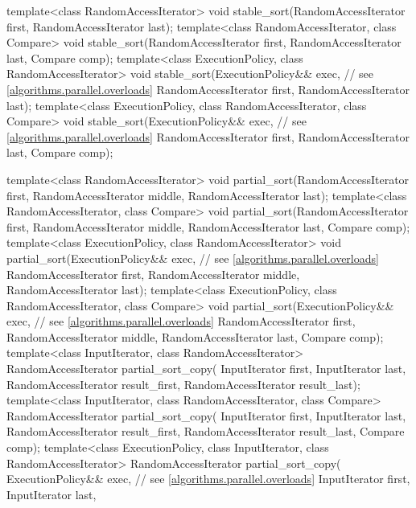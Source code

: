 \begin{codeblock}
{  template<class RandomAccessIterator>
    void stable_sort(RandomAccessIterator first, RandomAccessIterator last);
  template<class RandomAccessIterator, class Compare>
    void stable_sort(RandomAccessIterator first, RandomAccessIterator last,
                     Compare comp);
  template<class ExecutionPolicy, class RandomAccessIterator>
    void stable_sort(ExecutionPolicy&& exec, // see \ref{algorithms.parallel.overloads}
                     RandomAccessIterator first, RandomAccessIterator last);
  template<class ExecutionPolicy, class RandomAccessIterator, class Compare>
    void stable_sort(ExecutionPolicy&& exec, // see \ref{algorithms.parallel.overloads}
                     RandomAccessIterator first, RandomAccessIterator last,
                     Compare comp);

  template<class RandomAccessIterator>
    void partial_sort(RandomAccessIterator first,
                      RandomAccessIterator middle,
                      RandomAccessIterator last);
  template<class RandomAccessIterator, class Compare>
    void partial_sort(RandomAccessIterator first,
                      RandomAccessIterator middle,
                      RandomAccessIterator last, Compare comp);
  template<class ExecutionPolicy, class RandomAccessIterator>
    void partial_sort(ExecutionPolicy&& exec, // see \ref{algorithms.parallel.overloads}
                      RandomAccessIterator first,
                      RandomAccessIterator middle,
                      RandomAccessIterator last);
  template<class ExecutionPolicy, class RandomAccessIterator, class Compare>
    void partial_sort(ExecutionPolicy&& exec, // see \ref{algorithms.parallel.overloads}
                      RandomAccessIterator first,
                      RandomAccessIterator middle,
                      RandomAccessIterator last, Compare comp);
  template<class InputIterator, class RandomAccessIterator>
    RandomAccessIterator partial_sort_copy(
      InputIterator first, InputIterator last,
      RandomAccessIterator result_first,
      RandomAccessIterator result_last);
  template<class InputIterator, class RandomAccessIterator, class Compare>
    RandomAccessIterator partial_sort_copy(
      InputIterator first, InputIterator last,
      RandomAccessIterator result_first,
      RandomAccessIterator result_last,
      Compare comp);
  template<class ExecutionPolicy, class InputIterator, class RandomAccessIterator>
    RandomAccessIterator partial_sort_copy(
      ExecutionPolicy&& exec,  // see \ref{algorithms.parallel.overloads}
      InputIterator first, InputIterator last,
}
\end{codeblock}

